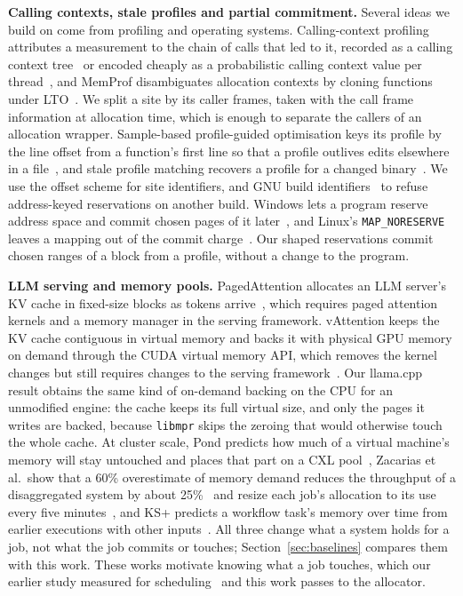 \documentclass[11pt]{article}
\newcommand{\libmpr}{\texttt{libmpr}}
\newcommand{\secref}[1]{Section~\ref{#1}}
\begin{document}
\textbf{Calling contexts, stale profiles and partial commitment.} Several ideas we build on come from profiling
and operating systems. Calling-context profiling attributes a measurement to the chain of calls that led to it,
recorded as a calling context tree~\cite{Ammons1997CCT} or encoded cheaply as a probabilistic calling context
value per thread~\cite{Bond2007PCC}, and MemProf disambiguates allocation contexts by cloning functions under
LTO~\cite{MemProf}. We split a site by its caller frames, taken with the call frame information at allocation time,
which is enough to separate the callers of an allocation wrapper. Sample-based profile-guided optimisation keys
its profile by the line offset from a function's first line so that a profile outlives edits elsewhere in a
file~\cite{Chen2016AutoFDO,ClangSampleProfile}, and stale profile matching recovers a profile for a changed
binary~\cite{Ayupov2024Stale}. We use the offset scheme for site identifiers, and GNU build identifiers~\cite{GNUld}
to refuse address-keyed reservations on another build. Windows lets a program reserve address space and commit
chosen pages of it later~\cite{MSVirtualAlloc}, and Linux's \texttt{MAP\_NORESERVE} leaves a mapping out of the commit
charge~\cite{LinuxOvercommit}. Our shaped reservations commit chosen ranges of a block from a profile, without a
change to the program.

\textbf{LLM serving and memory pools.} PagedAttention allocates an LLM server's KV cache in fixed-size blocks as
tokens arrive~\cite{Kwon2023vLLM}, which requires paged attention kernels and a memory manager in the serving
framework. vAttention keeps the KV cache contiguous in virtual memory and backs it with physical GPU memory on
demand through the CUDA virtual memory API, which removes the kernel changes but still requires changes to the
serving framework~\cite{Prabhu2025vAttention}. Our llama.cpp result obtains the same kind of on-demand backing on the
CPU for an unmodified engine: the cache keeps its full virtual size, and only the pages it writes are backed,
because \libmpr{} skips the zeroing that would otherwise touch the whole cache. At cluster scale, Pond predicts
how much of a virtual machine's memory will stay untouched and places that part on a CXL pool~\cite{Li2023Pond},
Zacarias et al.\ show that a 60\% overestimate of memory demand reduces the throughput of a disaggregated system
by about 25\%~\cite{Zacarias2021Accurate} and resize each job's allocation to its use every five
minutes~\cite{Zacarias2023Dynamic}, and KS+ predicts a workflow task's memory over time from earlier executions with
other inputs~\cite{KSplus2024}. All three change what a system holds for a job, not what the job commits or
touches; \secref{sec:baselines} compares them with this work. These works motivate knowing what a job touches, which our earlier study
measured for scheduling~\cite{memprintsched} and this work passes to the allocator.
\end{document}

